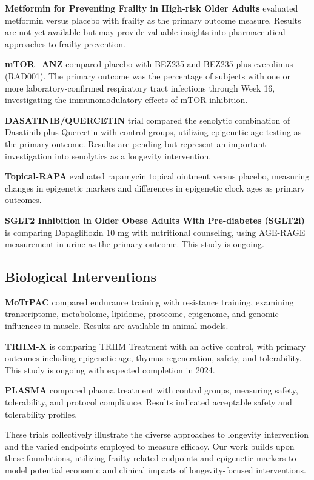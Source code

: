 \textbf{Metformin for Preventing Frailty in High-risk Older Adults} evaluated metformin versus placebo with frailty as the primary outcome measure. Results are not yet available but may provide valuable insights into pharmaceutical approaches to frailty prevention.

\textbf{mTOR\_ANZ} compared placebo with BEZ235 and BEZ235 plus everolimus (RAD001). The primary outcome was the percentage of subjects with one or more laboratory-confirmed respiratory tract infections through Week 16, investigating the immunomodulatory effects of mTOR inhibition.

\textbf{DASATINIB/QUERCETIN} trial compared the senolytic combination of Dasatinib plus Quercetin with control groups, utilizing epigenetic age testing as the primary outcome. Results are pending but represent an important investigation into senolytics as a longevity intervention.

\textbf{Topical-RAPA} evaluated rapamycin topical ointment versus placebo, measuring changes in epigenetic markers and differences in epigenetic clock ages as primary outcomes.

\textbf{SGLT2 Inhibition in Older Obese Adults With Pre-diabetes (SGLT2i)} is comparing Dapagliflozin 10 mg with nutritional counseling, using AGE-RAGE measurement in urine as the primary outcome. This study is ongoing.

\subsection{Biological Interventions}

\textbf{MoTrPAC} compared endurance training with resistance training, examining transcriptome, metabolome, lipidome, proteome, epigenome, and genomic influences in muscle. Results are available in animal models.

\textbf{TRIIM-X} is comparing TRIIM Treatment with an active control, with primary outcomes including epigenetic age, thymus regeneration, safety, and tolerability. This study is ongoing with expected completion in 2024.

\textbf{PLASMA} compared plasma treatment with control groups, measuring safety, tolerability, and protocol compliance. Results indicated acceptable safety and tolerability profiles.

These trials collectively illustrate the diverse approaches to longevity intervention and the varied endpoints employed to measure efficacy. Our work builds upon these foundations, utilizing frailty-related endpoints and epigenetic markers to model potential economic and clinical impacts of longevity-focused interventions.